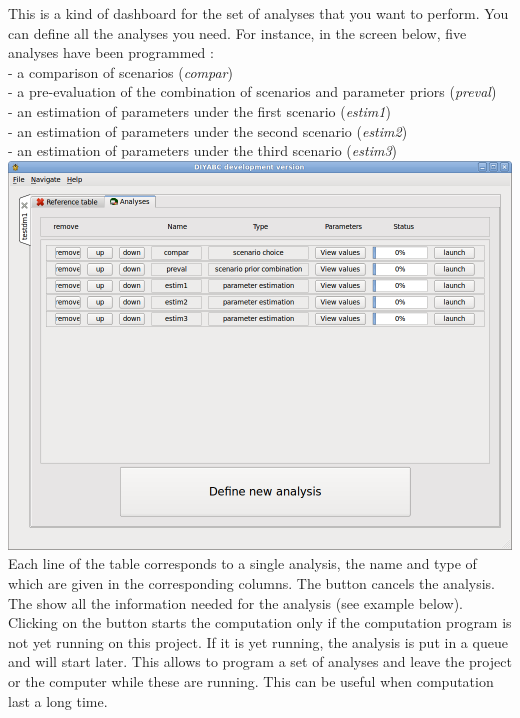  \vspace{20}
This is a kind of dashboard for the set of analyses that you want to perform. You can define all the analyses you need. For instance, in the screen below, five analyses have been programmed :\\
- a comparison of scenarios (\emph{compar})\\
- a pre-evaluation of the combination of scenarios and parameter priors (\emph{preval})\\
- an estimation of parameters under the first scenario (\emph{estim1})\\
- an estimation of parameters under the second scenario (\emph{estim2})\\
- an estimation of parameters under the third scenario (\emph{estim3})\\
\includegraphics[scale=0.3]{gui_pictures/Capture-DIYABC-34.png} 
 \vspace{20}
Each line of the table corresponds to a single analysis, the name and type of which are given in the corresponding columns. The  
 button cancels the analysis. The  show all the information needed for the analysis (see example below). Clicking on the  button starts the computation only if the computation program is not yet running on this project. If it is yet running, the analysis is put in a queue and will start later. This allows to program a set of analyses and leave the project or the computer while these are running. This can be useful when computation last a long time.
